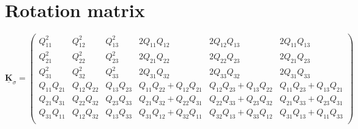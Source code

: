\documentclass[reprint,3p,sort&compress,times,onecolumn]{elsarticle}
\begin{document}
\section{Rotation matrix}\label{A1}

\begin{equation}
\underline{\mathbf{K}}_\sigma=
\left(             
  \begin{array}{cccccc}   %
    Q_{11}^2 & Q_{12}^2 & Q_{13}^2 & 2Q_{11}Q_{12} & 2Q_{12}Q_{13}& 2Q_{11}Q_{13}\\  %
    Q_{21}^2 & Q_{22}^2 & Q_{23}^2 & 2Q_{21}Q_{22} & 2Q_{22}Q_{23}& 2Q_{21}Q_{23}\\  %
    Q_{31}^2 & Q_{32}^2 & Q_{33}^2 & 2Q_{31}Q_{32} & 2Q_{33}Q_{32}& 2Q_{31}Q_{33}\\
    Q_{11}Q_{21} & Q_{12}Q_{22} & Q_{13}Q_{23} & Q_{11}Q_{22}+Q_{12}Q_{21} & Q_{12}Q_{23}+Q_{13}Q_{22}& Q_{11}Q_{23}+Q_{13}Q_{21}\\
    Q_{21}Q_{31} & Q_{22}Q_{32} & Q_{23}Q_{33} & Q_{21}Q_{32}+Q_{22}Q_{31} & Q_{22}Q_{33}+Q_{23}Q_{32}& Q_{21}Q_{33}+Q_{23}Q_{31}\\
    Q_{31}Q_{11} & Q_{12}Q_{32} & Q_{13}Q_{33} & Q_{31}Q_{12}+Q_{32}Q_{11} & Q_{32}Q_{13}+Q_{33}Q_{12}& Q_{31}Q_{13}+Q_{11}Q_{33}\\
  \end{array}
\right)
\end{equation}
\end{document}
